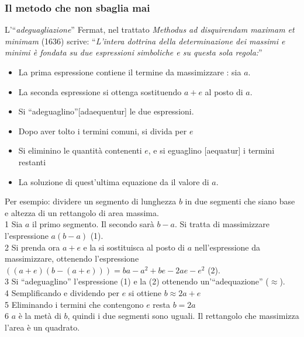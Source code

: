 \begin{frame}[label=Fermat-metodo]
    \frametitle{Il metodo che non sbaglia mai}
    \begin{block}{L'``\textit{adeguagliazione}''}
        Fermat, nel trattato \textit{Methodus ad disquirendam maximam et minimam} (1636) scrive:
        ``\textit{L'intera dottrina della determinazione dei massimi e minimi è
        fondata su due espressioni simboliche e su questa sola regola:}''
        \begin{itemize}
        \item<1-> La prima espressione contiene il termine da massimizzare : sia $a$.
        \item<2-> La seconda espressione si ottenga sostituendo $a+e$ al posto di $a$.
        \item<3-> Si ``\alert{adeguaglino}''[adaequentur] le due espressioni.
        \item<4-> Dopo aver tolto i termini comuni, si divida per $e$
        \item<5-> Si eliminino le quantità contenenti $e$, e si eguaglino [aequatur] i termini restanti
        \item<6-> La soluzione di quest'ultima equazione da il valore di $a$.
        \end{itemize}
    Per esempio: dividere un segmento di lunghezza $b$ in due segmenti che siano base e altezza 
    di un rettangolo di area massima.\\
    \alert{1} Sia $a$ il primo segmento. Il secondo sarà $b-a$. Si tratta di massimizzare l'espressione $a(b-a)$ (1).\\
    \alert{2} Si prenda ora $a+e$ e la si sostituisca al posto di $a$ nell'espressione da massimizzare, ottenendo
    l'espressione $((a+e)(b-(a+e))) = ba - a^2 +be -2ae -e^2$ (2).\\
    \alert{3} Si ``\alert{adeguaglino}'' l'espressione (1) e la (2) ottenendo un'``\alert{adequazione}'' ($\approx$).\\
    \alert{4} Semplificando e dividendo per $e$ si ottiene $b \approx 2a + e$\\ 
    \alert{5} Eliminando i termini che contengono $e$ resta $b = 2a$\\ 
    \alert{6} $a$ è la metà di $b$, quindi i due segmenti sono uguali. Il rettangolo che massimizza l'area è un quadrato.    
    \end{block}
\end{frame}